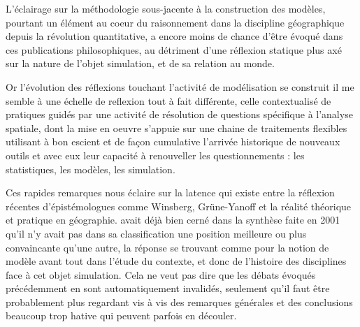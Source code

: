 L'éclairage sur la méthodologie sous-jacente à la construction des modèles, pourtant un élément au coeur du raisonnement dans la discipline géographique depuis la révolution quantitative, a encore moins de chance d'être évoqué dans ces publications philosophiques, au détriment d'une réflexion statique plus axé sur la nature de l'objet simulation, et de sa relation au monde.

Or l'évolution des réflexions touchant l'activité de modélisation se construit il me semble à une échelle de reflexion tout à fait différente, celle contextualisé de pratiques guidés par une activité de résolution de questions spécifique à l'analyse spatiale, dont la mise en oeuvre s'appuie sur une chaine de traitements flexibles utilisant à bon escient et de façon cumulative l'arrivée historique de nouveaux outils et avec eux leur capacité à renouveller les questionnements : les statistiques, les modèles, les simulation.



Ces rapides remarques nous éclaire sur la latence qui existe entre la réflexion récentes d'épistémologues comme Winsberg, Grüne-Yanoff et la réalité théorique et pratique en géographie. \textcite{Varenne2001} avait déjà bien cerné dans la synthèse faite en 2001 qu'il n'y avait pas dans sa classification une position meilleure ou plus convaincante qu'une autre, la réponse se trouvant comme pour la notion de modèle avant tout dans l'étude du contexte, et donc de l'histoire des disciplines face à cet objet simulation.  Cela ne veut pas dire que les débats évoqués précédemment en sont automatiquement invalidés, seulement qu'il faut être probablement plus regardant vis à vis des remarques générales et des conclusions beaucoup trop hative qui peuvent parfois en découler. 

